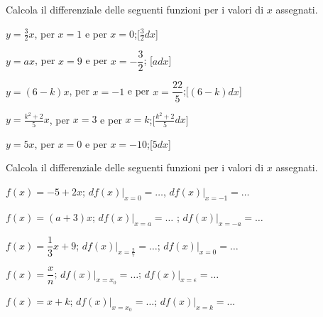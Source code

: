  \begin{esercizio}\label{ese:dif03}
Calcola il differenziale delle seguenti funzioni per i valori di \(x\) assegnati.
 \begin{enumeratea}
  \item  \(y=\frac{3}{2}x\), \hspace{5mm}per \(x=1\) e per \(x=0\);\hfill [\(\frac{3}{2}dx\)]
  \item  \(y=ax\), \hspace{5mm}per \(x=9\) e per \(x=-\dfrac{3}{2}\); \hfill [\(adx\)]
  \item  \(y=(6-k)x\), \hspace{5mm}per \(x=-1\) e per \(x=\dfrac{22}{5}\);\hfill [\((6-k)dx\)]
  \item  \(y=\frac{k^2+2}{5}x\), \hspace{5mm}per \(x=3\) e per \(x=k\);\hfill [\(\frac{k^2+2}{5}dx\)]
  \item  \(y=5x\), \hspace{5mm}per \(x=0\) e per \(x=-10\);\hfill [\(5dx\)]
 \end{enumeratea}
\end{esercizio}
 
\begin{esercizio}\label{ese:dif04}
Calcola il differenziale delle seguenti funzioni per i valori di \(x\) assegnati.
 \begin{enumeratea}
  \item  \(f(x) = -5+2x\);\hspace{5mm} \(df(x)|_{x=0}=\dots\),
  \hspace{5mm}\(df(x)|_{x=-1}=\dots\)
  \item  \(f(x) = (a+3)x\);\hspace{5mm} \(df(x)|_{x=a}=\dots\)
  ;\hspace{5mm}   \(df(x)|_{x=-a}=\dots\)
  \item  \(f(x) = \dfrac{1}{3}x+9\);\hspace{5mm} \(df(x)|_{x=\frac{2}{7}}=\dots\);
  \hspace{5mm}   \(df(x)|_{x=0}=\dots\)
  \item  \(f(x) = \dfrac{x}{n}\);\hspace{5mm} \(df(x)|_{x=x_0}=\dots\);
  \hspace{5mm}   \(df(x)|_{x=\epsilon}=\dots\)
  \item  \(f(x) = x+k\);\hspace{5mm} \(df(x)|_{x=x_0}=\dots\);
  \hspace{5mm}   \(df(x)|_{x=k}=\dots\)
 \end{enumeratea}
\end{esercizio}

